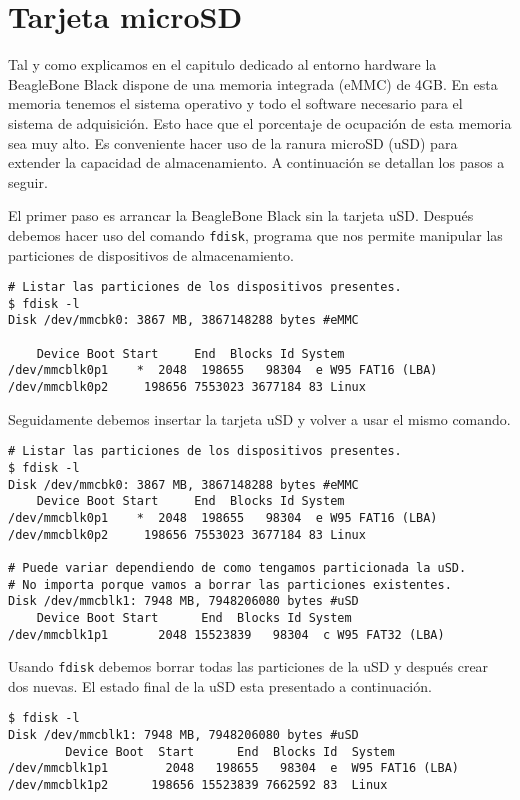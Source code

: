 	\section{Tarjeta microSD}
		Tal y como explicamos en el capitulo dedicado al entorno hardware la BeagleBone Black dispone de una memoria integrada (eMMC) de 4GB.
		En esta memoria tenemos el sistema operativo y todo el software necesario para el sistema de adquisición. Esto hace que el porcentaje
		de ocupación de esta memoria sea muy alto. Es conveniente hacer uso de la ranura microSD (uSD) para extender  la capacidad de
		almacenamiento. A continuación se detallan los pasos a seguir.
		\par
		El primer paso es arrancar la BeagleBone Black sin la tarjeta uSD. Después debemos hacer uso del comando \texttt{fdisk}, programa que
		nos permite manipular las particiones de dispositivos de almacenamiento.
		\begin{lstlisting}[style=myBash]
# Listar las particiones de los dispositivos presentes.
$ fdisk -l
Disk /dev/mmcbk0: 3867 MB, 3867148288 bytes #eMMC

	Device Boot Start     End  Blocks Id System
/dev/mmcblk0p1    *  2048  198655   98304  e W95 FAT16 (LBA)
/dev/mmcblk0p2     198656 7553023 3677184 83 Linux
		\end{lstlisting}
		Seguidamente debemos insertar la tarjeta uSD y volver a usar el mismo comando.
		\begin{lstlisting}[style=myBash]
# Listar las particiones de los dispositivos presentes.
$ fdisk -l
Disk /dev/mmcbk0: 3867 MB, 3867148288 bytes #eMMC
	Device Boot Start     End  Blocks Id System
/dev/mmcblk0p1    *  2048  198655   98304  e W95 FAT16 (LBA)
/dev/mmcblk0p2     198656 7553023 3677184 83 Linux

# Puede variar dependiendo de como tengamos particionada la uSD.
# No importa porque vamos a borrar las particiones existentes.
Disk /dev/mmcblk1: 7948 MB, 7948206080 bytes #uSD
	Device Boot Start      End  Blocks Id System
/dev/mmcblk1p1       2048 15523839   98304  c W95 FAT32 (LBA)
		\end{lstlisting}
		Usando \texttt{fdisk} debemos borrar todas las particiones de la uSD y después crear dos nuevas. El estado final de la uSD esta
		presentado a continuación.
		\begin{lstlisting}[style=myBash]
$ fdisk -l
Disk /dev/mmcblk1: 7948 MB, 7948206080 bytes #uSD
        Device Boot  Start      End  Blocks Id  System
/dev/mmcblk1p1        2048   198655   98304  e  W95 FAT16 (LBA)
/dev/mmcblk1p2      198656 15523839 7662592 83  Linux
		\end{lstlisting}
